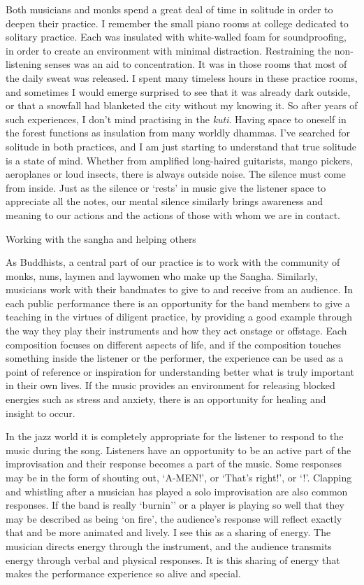 Both musicians and monks spend a great deal of time in solitude in order
to deepen their practice. I remember the small piano rooms at college
dedicated to solitary practice. Each was insulated with white-walled
foam for soundproofing, in order to create an environment with minimal
distraction. Restraining the non-listening senses was an aid to
concentration. It was in those rooms that most of the daily sweat was
released. I spent many timeless hours in these practice rooms, and
sometimes I would emerge surprised to see that it was already dark
outside, or that a snowfall had blanketed the city without my knowing
it. So after years of such experiences, I don't mind practising in the
\emph{kuti}. Having space to oneself in the forest functions as
insulation from many worldly dhammas. I've searched for solitude in both
practices, and I am just starting to understand that true solitude is a
state of mind. Whether from amplified long-haired guitarists, mango
pickers, aeroplanes or loud insects, there is always outside noise. The
silence must come from inside. Just as the silence or `rests' in music
give the listener space to appreciate all the notes, our mental silence
similarly brings awareness and meaning to our actions and the actions of
those with whom we are in contact.

Working with the sangha and helping others

As Buddhists, a central part of our practice is to work with the
community of monks, nuns, laymen and laywomen who make up the Sangha.
Similarly, musicians work with their bandmates to give to and receive
from an audience. In each public performance there is an opportunity for
the band members to give a teaching in the virtues of diligent practice,
by providing a good example through the way they play their instruments
and how they act onstage or offstage. Each composition focuses on
different aspects of life, and if the composition touches something
inside the listener or the performer, the experience can be used as a
point of reference or inspiration for understanding better what is truly
important in their own lives. If the music provides an environment for
releasing blocked energies such as stress and anxiety, there is an
opportunity for healing and insight to occur.

In the jazz world it is completely appropriate for the listener to
respond to the music during the song. Listeners have an opportunity to
be an active part of the improvisation and their response becomes a part
of the music. Some responses may be in the form of shouting out,
`A-MEN!', or `That's right!', or `!'. Clapping and whistling after a
musician has played a solo improvisation are also common responses. If
the band is really `burnin'' or a player is playing so well that they
may be described as being `on fire', the audience's response will
reflect exactly that and be more animated and lively. I see this as a
sharing of energy. The musician directs energy through the instrument,
and the audience transmits energy through verbal and physical responses.
It is this sharing of energy that makes the performance experience so
alive and special.

